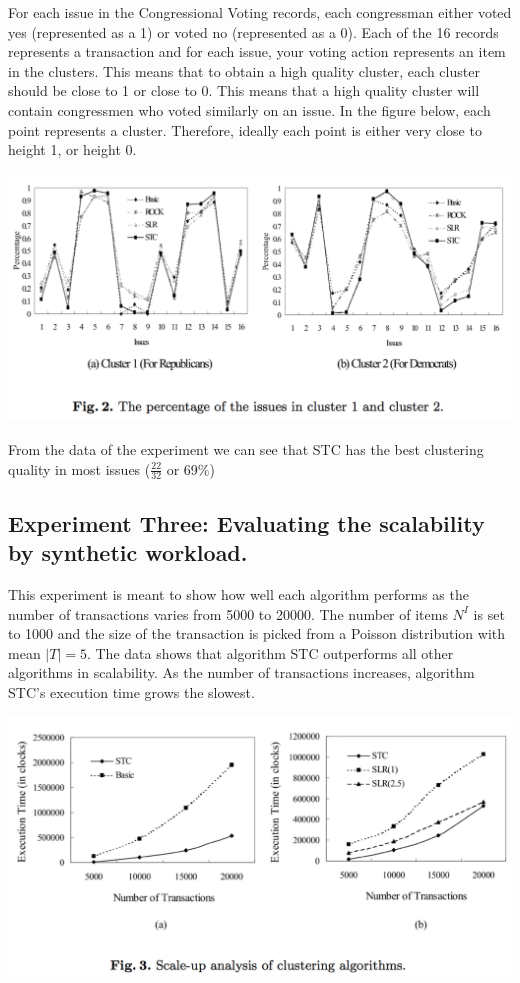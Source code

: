 \documentclass[11pt,reqno]{amsart}
\theoremstyle{definition}
\numberwithin{equation}{subsection}
\begin{document}
For each issue in the Congressional Voting records, each congressman either voted yes (represented as a 1) or voted no (represented as a 0). Each of the 16 records represents a transaction and for each issue, your voting action represents an item in the clusters. This means that to obtain a high quality cluster, each cluster should be close to 1 or close to 0.  This means that a high quality cluster will contain congressmen who voted similarly on an issue.  In the figure below,  each point represents a cluster. Therefore, ideally each point is either very close to height 1, or height 0.

\includegraphics[scale=.75]{pic2}

From the data of the experiment we can see that STC has the best clustering quality in most issues ($\frac{22}{32}$ or 69$\%$)

\subsection{Experiment Three: Evaluating the scalability by synthetic workload.} This experiment is meant to show how well each algorithm performs as the number of transactions varies from 5000 to 20000. The number of items $N^I$ is set to 1000 and the size of the transaction is picked from a Poisson distribution with mean $|T| = 5$. The data shows that algorithm STC outperforms all other algorithms in scalability. As the number of transactions increases, algorithm STC's execution time grows the slowest.

\includegraphics[scale=.75]{pic3}
\end{document}
